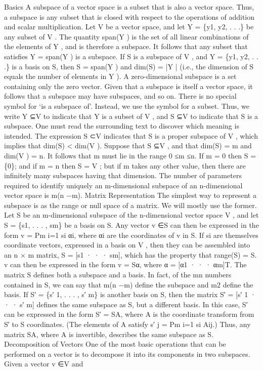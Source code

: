 Basics A subspace of a vector space is a subset that is also a vector space. Thus, a subspace is any subset that is closed with respect to the operations of addition and scalar multiplication. Let V be a vector space, and let Y = \{y1, y2, . . .\} be any subset of V . The quantity span(Y ) is the set of all linear combinations of the elements of Y , and is therefore a subspace. It follows that any subset that satisfies Y = span(Y ) is a subspace. If S is a subspace of V , and Y = \{y1, y2, . . .\} is a basis on S, then S = span(Y ) and dim(S) = |Y | (i.e., the dimension of S equals the number of elements in Y ). A zero-dimensional subspace is a set containing only the zero vector. Given that a subspace is itself a vector space, it follows that a subspace may have subspaces, and so on. There is no special symbol for ‘is a subspace of’. Instead, we use the symbol for a subset. Thus, we write Y ⊆V to indicate that Y is a subset of V , and S ⊆V to indicate that S is a subspace. One must read the surrounding text to discover which meaning is intended. The expression S ⊂V indicates that S is a proper subspace of V , which implies that dim(S) < dim(V ). Suppose that S ⊆V , and that dim(S) = m and dim(V ) = n. It follows that m must lie in the range 0 ≤m ≤n. If m = 0 then S = \{0\}; and if m = n then S = V ; but if m takes any other value, then there are infinitely many subspaces having that dimension. The number of parameters required to identify uniquely an m-dimensional subspace of an n-dimensional vector space is m(n −m). Matrix Representation The simplest way to represent a subspace is as the range or null space of a matrix. We will mostly use the former. Let S be an m-dimensional subspace of the n-dimensional vector space V , and let S = \{s1, . . . , sm\} be a basis on S. Any vector v ∈S can then be expressed in the form v = Pm i=1 si αi, where αi are the coordinates of v in S. If si are themselves coordinate vectors, expressed in a basis on V , then they can be assembled into an n × m matrix, S = [s1 · · · sm], which has the property that range(S) = S. v can then be expressed in the form v = Sα, where α = [α1 · · · αm]T. The matrix S defines both a subspace and a basis. In fact, of the mn numbers contained in S, we can say that m(n −m) define the subspace and m2 define the basis. If S′ = \{s′ 1, . . . , s′ m\} is another basis on S, then the matrix S′ = [s′ 1 · · · s′ m] defines the same subspace as S, but a different basis. In this case, S′ can be expressed in the form S′ = SA, where A is the coordinate transform from S′ to S coordinates. (The elements of A satisfy s′ j = Pm i=1 si Aij.) Thus, any matrix SA, where A is invertible, describes the same subspace as S. Decomposition of Vectors One of the most basic operations that can be performed on a vector is to decompose it into its components in two subspaces. Given a vector v ∈V and

